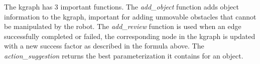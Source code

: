 The \ac{kgraph} has 3 important functions. The \textit{add\_object} function adds object information to the \ac{kgraph}, important for adding unmovable obstacles that cannot be manipulated by the robot. The \textit{add\_review} function is used when an edge successfully completed or failed, the corresponding node in the \ac{kgraph} is updated with a new success factor as described in the formula above. The \textit{action\_suggestion} returns the best parameterization it contains for an object.\bs

